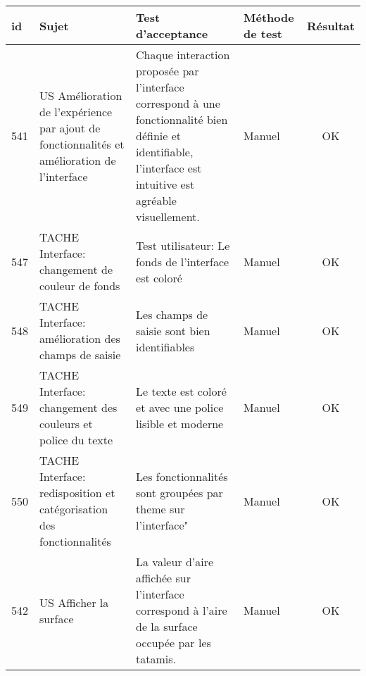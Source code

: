 \noindent%
\begin{adjustwidth}{-1.5cm}{0cm}

    \renewcommand{\arraystretch}{1.2}
    {\setlength{\tabcolsep}{1.5 mm}
        \begin{tabular}{|m{0.6cm}|m{5.5cm}|m{8cm}|m{2cm}|c|} \hline
            id  & Sujet                                                                                                              & Test d'acceptance                                                                                                                                                                                                                  & Méthode de test & Résultat \\ \hline
            541 & US Amélioration de l'expérience par ajout de fonctionnalités et amélioration de l'interface                        & \cellcolor{tsgrey}Chaque interaction proposée par l'interface correspond à une fonctionnalité bien définie et identifiable, l'interface est intuitive est agréable visuellement.                                                                     & Manuel          & OK       \\ \hline
            547 & TACHE Interface: changement de couleur de fonds                                                                    & \cellcolor{tsgrey}Test utilisateur: Le fonds de l'interface est coloré& Manuel          & OK       \\ \hline
            548 & TACHE Interface: amélioration des champs de saisie                                                                 & \cellcolor{tsgrey}Les champs de saisie sont bien identifiables& Manuel          & OK       \\ \hline
            549 & TACHE Interface: changement des couleurs et police du texte                                                        & \cellcolor{tsgrey} Le texte est coloré et avec une police lisible et moderne& Manuel          & OK       \\ \hline
            550 & TACHE Interface: redisposition et catégorisation des fonctionnalités                                               & \cellcolor{tsgrey}Les fonctionnalités sont groupées par theme sur l'interface"& Manuel          & OK       \\ \hline
            542 & US Afficher la surface                                                                                             & \cellcolor{tsgrey} La valeur d'aire affichée sur l'interface correspond à l'aire de la surface occupée par les tatamis.& Manuel          & OK       \\ \hline
        \end{tabular}}
\end{adjustwidth}